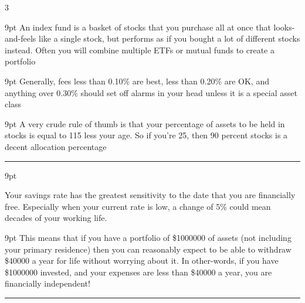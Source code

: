 \documentclass[landscape]{article}
\newcommand{\myline}{\vspace{4pt}\hrule  \vspace{4pt}}
\newcommand{\commasep}[1]{\num[group-separator={,}]{#1}}
\newcommand{\money}[1]{\$\commasep{#1}}
\newenvironment{topic}[1]{
	\noindent \textbf{\textsc{\color{harvardcrimson}{#1}}}
	\noindent \hspace{-3.5pt}
}{
	\myline
}
\newenvironment{prin}[1]{
	\noindent \textit{\color{black}{#1}}
	\begin{adjustwidth}{9pt}{}
		\color{dark-grey}
	}{
	\end{adjustwidth}
}
\begin{document}
\begin{multicols*}{3}
\begin{topic}{Investing Principals}
		\begin{prin}{Principal I\princount: The Principal of Index Funds: Index funds (especially ETFs) can provide a great mix of assets for reasonable costs} An index fund is a basket of stocks that you purchase all at once that looks-and-feels like a single stock, but performs as if you bought a lot of different stocks instead. Often you will combine multiple ETFs or mutual funds to create a portfolio \end{prin}
		 
	
		\begin{prin}{Principal I\princount: The Principal of Fees: Watch out for fees anytime that you purchase a mutual fund or index fund - they can eat alive your return} Generally, fees less than 0.10\% are best, less than 0.20\% are OK, and anything over 0.30\% should set off alarms in your head unless it is a special asset class\end{prin}
			
	
		\begin{prin}{Principal I\princount: The Principal of Time: When investing for time periods of $ > $ 10 years, you can afford much riskier allocations than someone who is retiring sooner} A very crude rule of thumb is that your percentage of assets to be held in stocks is equal to 115 less your age. So if you're 25, then 90 percent stocks is a decent allocation percentage\end{prin}
	\end{topic} \resetprincount
	
	
	\begin{topic}{Personal Finance Principals}
	
		\begin{prin}{Principal P\princount: The Principal of Savings Rate: Your Savings Rate is the most important number that you can control - nothing else comes even close} 
		Your savings rate has the greatest sensitivity to the date that you are financially free. Especially when your current rate is low, a change of 5\% could mean decades of your working life. 	
		\end{prin}
			
		\begin{prin}{Principal P\princount: The Principal of 4\%: Most financial research indicates that you can can withdraw 4\% of your portfolio almost indefinitely - this sets your threshold for retirement} This means that if you have a portfolio of \money{1000000} of assets (not including your primary residence) then you can reasonably expect to be able to withdraw \money{40000} a year for life without 
		worrying about it. In other-words, if you have \money{1000000} invested, and your expenses are less than \money{40000} a year, you are financially independent!
		\end{prin}
						

\end{topic}
\end{multicols*}
\end{document}
